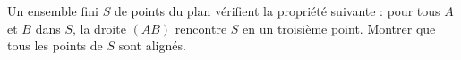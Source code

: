 Un ensemble fini $S$ de points du plan vérifient la propriété suivante : pour tous $A$ et $B$ dans $S$, la droite $(AB)$ rencontre $S$ en un troisième point. Montrer que tous les points de $S$ sont alignés.
